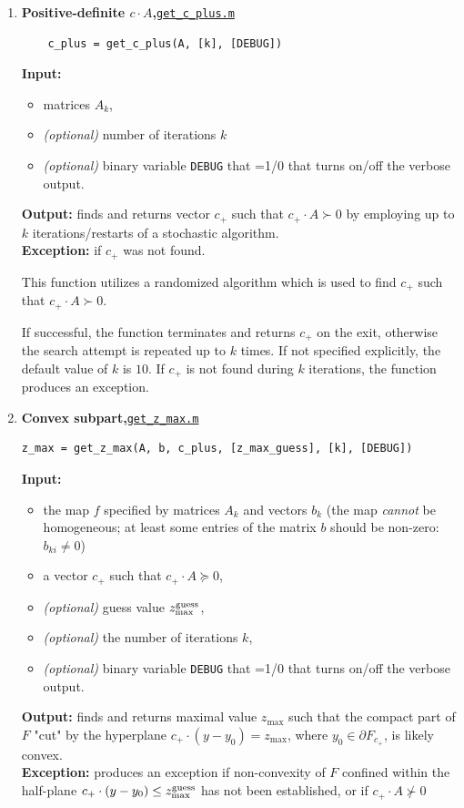 \documentclass[a4paper]{article}
\theoremstyle{definition}
\begin{document}
\begin{enumerate}
{\bf Exceptions:} None.

	
This function calls {\tt get\_c\_minus} and returns  {\tt is\_nonconvex}=$1$ if the latter returns a non-trivial $c$. 


\item {\bf Positive-definite $c\cdot A$,\hskip 6pt}\underline{\tt get\_c\_plus.m}
\begin{verbatim}
	c_plus = get_c_plus(A, [k], [DEBUG])
\end{verbatim}

{\bf Input:}
\begin{itemize}
	\item matrices $A_k$,
	\item {\it (optional)} number of iterations $k$
	\item {\it (optional)} binary variable {\tt DEBUG} that =1/0 that turns on/off the verbose output.
\end{itemize}
{\bf Output:} finds and returns vector $c_+$ such that $c_+\cdot A\succ 0$ by employing up to $k$ iterations/restarts of a stochastic algorithm.\\
{\bf Exception:} if $c_+$  was not found.
	
This function utilizes a randomized algorithm which is used to find $c_+$ such that $c_+\cdot A\succ 0$.

If successful, the function terminates and returns $c_+$ on the exit, otherwise the search attempt is repeated up to $k$ times.
If not specified explicitly, the default value of $k$ is $10$.
If $c_+$ is not found during $k$ iterations, the function produces an exception.

	
\item {\bf Convex subpart,\hskip 6pt}\underline{\tt get\_z\_max.m}
\begin{verbatim}
z_max = get_z_max(A, b, c_plus, [z_max_guess], [k], [DEBUG])
\end{verbatim}
{\bf Input:}
\begin{itemize}
	\item the map $f$ specified by matrices $A_k$ and vectors $b_k$ (the map {\it cannot} be homogeneous; at least some entries of the matrix $b$ should be non-zero: $b_{ki}\neq 0$)
	\item a vector $c_+$ such that $c_+\cdot A\succeq 0$,
	\item {\it (optional)}  guess value  $z^{\rm guess}_{\rm max}$,
	\item {\it (optional)} the number of iterations $k$,
	\item {\it (optional)}  binary variable {\tt DEBUG} that =1/0 that turns on/off the verbose output.
\end{itemize}
{\bf Output:} finds and returns maximal value $z_{\max}$ such that the compact part of $F$ "cut" by the hyperplane  $c_+ \cdot (y-y_0)=z_{\max}$, where $y_0\in \partial F_{c_+}$, is  likely convex. \\
{\bf Exception:} produces an exception if non-convexity of $F$ confined within the half-plane $c_+ \cdot (y-y_0)\leq z^{\rm guess}_{\rm max}$ has not been established, or if $c_+\cdot A\nsucc 0$


\end{enumerate}
\end{document}
